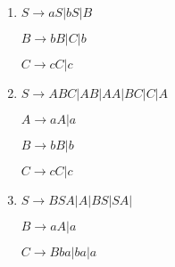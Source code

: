 \begin{question}

    \begin{enumerate}[label=\textbf{\alph*})]
        \item 

        $S \rightarrow aS | bS | B $
  
        $B \rightarrow bB | C | b $
    
        $C \rightarrow cC | c $

        \item

        $S \rightarrow ABC | AB | AA | BC | C | A $
  
        $A \rightarrow aA | a $
    
        $B \rightarrow bB | b $

        $C \rightarrow cC | c $ 

        \item 

        $S \rightarrow BSA | A | BS | SA |$
  
        $B \rightarrow aA | a $
    
        $C \rightarrow Bba | ba | a $

    \end{enumerate}


\end{question}